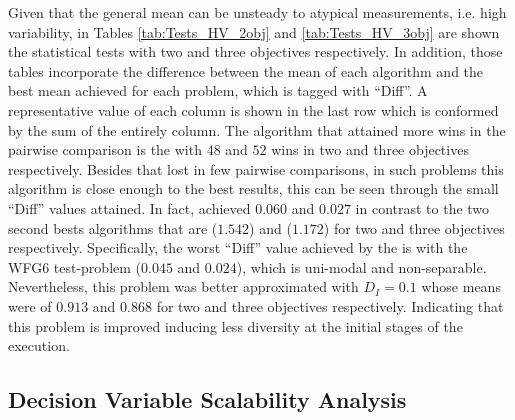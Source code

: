 Given that the general mean can be unsteady to atypical measurements, i.e. high variability, in Tables \ref{tab:Tests_HV_2obj} and \ref{tab:Tests_HV_3obj} are shown the statistical tests with two and three objectives respectively.
%
In addition, those tables incorporate the difference between the mean of each algorithm and the best mean achieved for each problem, which is tagged with ``Diff''.
%
A representative value of each column is shown in the last row which is conformed by the sum of the entirely column.
%
The algorithm that attained more wins in the pairwise comparison is the \VSDMOEA{} with $48$ and $52$ wins in two and three objectives respectively.
%
Besides that \VSDMOEA{} lost in few pairwise comparisons, in such problems this algorithm is close enough to the best results, this can be seen through the small ``Diff'' values attained.
%
In fact, \VSDMOEA{} achieved $0.060$ and $0.027$ in contrast to the two second bests algorithms that are \NSGAII{} ($1.542$) and \RMOEA{} ($1.172$) for two and three objectives respectively.
%
Specifically, the worst ``Diff'' value achieved by the \VSDMOEA{} is with the WFG6 test-problem ($0.045$ and $0.024$), which is uni-modal and non-separable.
%
Nevertheless, this problem was better approximated with $D_I=0.1$ whose means were of $0.913$ and $0.868$ for two and three objectives respectively.
%
Indicating that this problem is improved inducing less diversity at the initial stages of the execution.
%

\subsection{Decision Variable Scalability Analysis}

